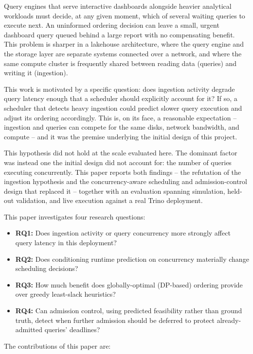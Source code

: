 \documentclass[conference]{IEEEtran}
\begin{document}
Query engines that serve interactive dashboards alongside heavier analytical workloads must decide, at any given moment, which of several waiting queries to execute next. An uninformed ordering decision can leave a small, urgent dashboard query queued behind a large report with no compensating benefit. This problem is sharper in a lakehouse architecture, where the query engine and the storage layer are separate systems connected over a network, and where the same compute cluster is frequently shared between reading data (queries) and writing it (ingestion).

This work is motivated by a specific question: does ingestion activity degrade query latency enough that a scheduler should explicitly account for it? If so, a scheduler that detects heavy ingestion could predict slower query execution and adjust its ordering accordingly. This is, on its face, a reasonable expectation -- ingestion and queries can compete for the same disks, network bandwidth, and compute -- and it was the premise underlying the initial design of this project.

This hypothesis did not hold at the scale evaluated here. The dominant factor was instead one the initial design did not account for: the number of queries executing concurrently. This paper reports both findings -- the refutation of the ingestion hypothesis and the concurrency-aware scheduling and admission-control design that replaced it -- together with an evaluation spanning simulation, held-out validation, and live execution against a real Trino deployment.

This paper investigates four research questions:

\begin{itemize}
\item \textbf{RQ1:} Does ingestion activity or query concurrency more strongly affect query latency in this deployment?
\item \textbf{RQ2:} Does conditioning runtime prediction on concurrency materially change scheduling decisions?
\item \textbf{RQ3:} How much benefit does globally-optimal (DP-based) ordering provide over greedy least-slack heuristics?
\item \textbf{RQ4:} Can admission control, using predicted feasibility rather than ground truth, detect when further admission should be deferred to protect already-admitted queries' deadlines?
\end{itemize}

The contributions of this paper are:
\end{document}
